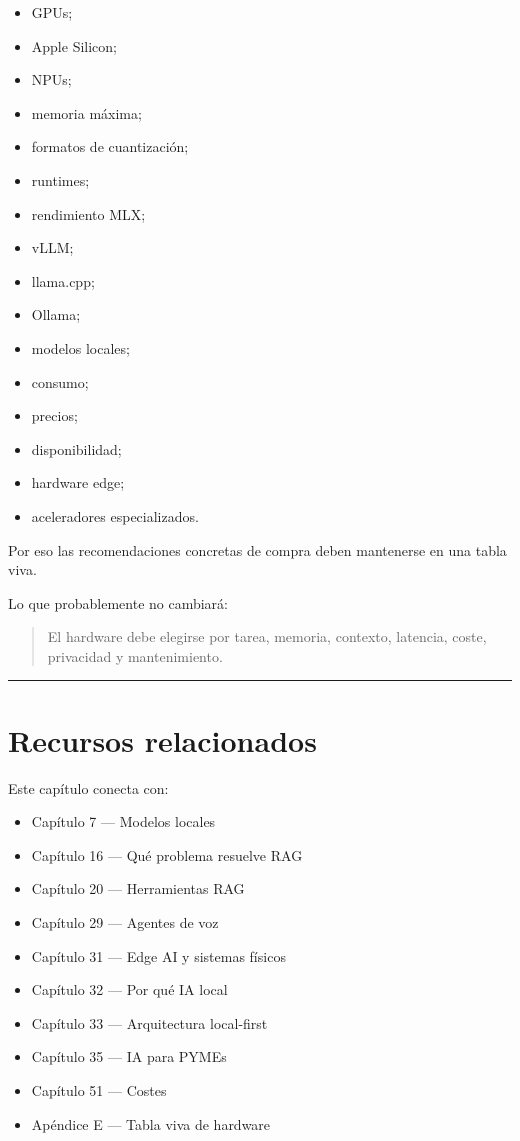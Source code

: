 \begin{itemize}
\tightlist
\item
  GPUs;
\item
  Apple Silicon;
\item
  NPUs;
\item
  memoria máxima;
\item
  formatos de cuantización;
\item
  runtimes;
\item
  rendimiento MLX;
\item
  vLLM;
\item
  llama.cpp;
\item
  Ollama;
\item
  modelos locales;
\item
  consumo;
\item
  precios;
\item
  disponibilidad;
\item
  hardware edge;
\item
  aceleradores especializados.
\end{itemize}

Por eso las recomendaciones concretas de compra deben mantenerse en una
tabla viva.

Lo que probablemente no cambiará:

\begin{quote}
El hardware debe elegirse por tarea, memoria, contexto, latencia, coste,
privacidad y mantenimiento.
\end{quote}

\begin{center}\rule{0.5\linewidth}{0.5pt}\end{center}

\section{Recursos relacionados}\label{recursos-relacionados-7}

Este capítulo conecta con:

\begin{itemize}
\tightlist
\item
  Capítulo 7 --- Modelos locales
\item
  Capítulo 16 --- Qué problema resuelve RAG
\item
  Capítulo 20 --- Herramientas RAG
\item
  Capítulo 29 --- Agentes de voz
\item
  Capítulo 31 --- Edge AI y sistemas físicos
\item
  Capítulo 32 --- Por qué IA local
\item
  Capítulo 33 --- Arquitectura local-first
\item
  Capítulo 35 --- IA para PYMEs
\item
  Capítulo 51 --- Costes
\item
  Apéndice E --- Tabla viva de hardware
\end{itemize}

